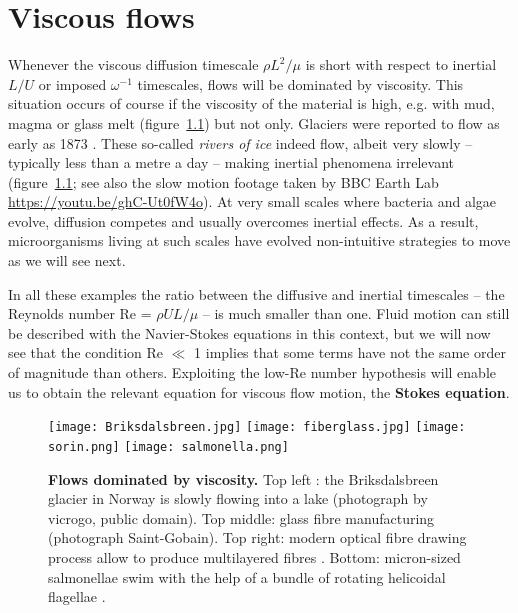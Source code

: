 \chapter{Viscous flows}
\label{chap:viscous_flows}
Whenever the viscous diffusion timescale $\rho L^2/\mu$ is short with respect to inertial $L/U$ or imposed $\omega^{-1}$ timescales, flows will be dominated by viscosity. This situation occurs of course if the viscosity of the material is high, e.g. with mud, magma or glass melt (figure~\ref{fig:viscous_flows}) but not only. Glaciers were reported to flow as early as 1873 \citep{Aitken1873}. These so-called \textit{rivers of ice} indeed flow, albeit very slowly -- typically less than a metre a day -- making inertial phenomena irrelevant (figure~\ref{fig:viscous_flows}; see also the slow motion footage taken by BBC Earth Lab \url{https://youtu.be/ghC-Ut0fW4o}). At very small scales where bacteria and algae evolve, diffusion competes and usually overcomes inertial effects. As a result, microorganisms living at such scales have evolved non-intuitive strategies to move as we will see next.

In all these examples the ratio between the diffusive and inertial timescales -- the Reynolds number Re = $\rho U L/\mu$ -- is much smaller than one. Fluid motion can still be described with the Navier-Stokes equations in this context, but we will now see that the condition Re $\ll$ 1 implies that some terms have not the same order of magnitude than others. Exploiting the low-Re number hypothesis will enable us to obtain the relevant equation for viscous flow motion, the \textbf{Stokes equation}.

\begin{figure}[htbp]
\begin{center}
\texttt{[image: Briksdalsbreen.jpg]}
\texttt{[image: fiberglass.jpg]}
\texttt{[image: sorin.png]}
\texttt{[image: salmonella.png]}
\caption{\textbf{Flows dominated by viscosity.} Top left : the Briksdalsbreen glacier in Norway is slowly flowing into a lake (photograph by vicrogo, public domain). Top middle: glass fibre manufacturing (photograph Saint-Gobain). Top right: modern optical fibre drawing process allow to produce multilayered fibres \citep{Abouraddy2007}. Bottom: micron-sized salmonellae swim with the help of a bundle of rotating helicoidal flagellae \citep{Elgeti2015}.}
\label{fig:viscous_flows}
\end{center}
\end{figure}

